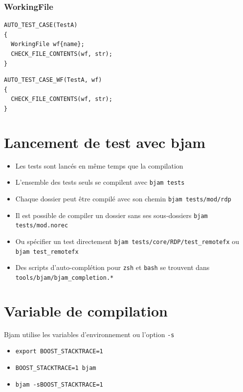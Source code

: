 \documentclass{beamer}
\begin{document}
\begin{frame}[fragile]
\frametitle{WorkingFile}

\begin{exampleblock}{}
\begin{lstlisting}
AUTO_TEST_CASE(TestA)
{
  WorkingFile wf{name};
  CHECK_FILE_CONTENTS(wf, str);
}
\end{lstlisting}
\end{exampleblock}

\begin{exampleblock}{}
\begin{lstlisting}
AUTO_TEST_CASE_WF(TestA, wf)
{
  CHECK_FILE_CONTENTS(wf, str);
}
\end{lstlisting}
\end{exampleblock}
\end{frame}


\section{Lancement de test avec bjam}


\begin{frame}[fragile]

\begin{itemize}[<+->]
 \item Les tests sont lancés en même temps que la compilation
 \item L'ensemble des tests seuls se compilent avec \lstinline{bjam tests}
 \item Chaque dossier peut être compilé avec son chemin \lstinline{bjam tests/mod/rdp}
 \item Il est possible de compiler un dossier sans ses sous-dossiers \lstinline{bjam tests/mod.norec}
 \item Ou spécifier un test directement \lstinline{bjam tests/core/RDP/test_remotefx} ou  \lstinline{bjam test_remotefx}
 \item Des scripts d'auto-complétion pour \lstinline{zsh} et \lstinline{bash} se trouvent dans \lstinline{tools/bjam/bjam_completion.*}
\end{itemize}

\end{frame}



\section{Variable de compilation}

\begin{frame}[fragile]

Bjam utilise les variables d'environnement ou l'option \lstinline{-s}

\begin{itemize}[<+->]
 \item \lstinline{export BOOST_STACKTRACE=1}
 \item \lstinline{BOOST_STACKTRACE=1 bjam}
 \item \lstinline{bjam -sBOOST_STACKTRACE=1}
\end{itemize}

\end{frame}
\end{document}
